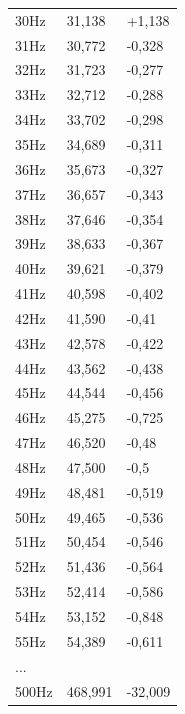 \begin{tabularx}{\textwidth}{lll}
30Hz
 &
31,138
 &
+1,138
\\

31Hz
 &
30,772
 &
-0,328
\\

32Hz
 &
31,723
 &
-0,277
\\

33Hz
 &
32,712
 &
-0,288
\\

34Hz
 &
33,702
 &
-0,298
\\

35Hz
 &
34,689
 &
-0,311
\\

36Hz
 &
35,673
 &
-0,327
\\

37Hz
 &
36,657
 &
-0,343
\\

38Hz
 &
37,646
 &
-0,354
\\

39Hz
 &
38,633
 &
-0,367
\\

40Hz
 &
39,621
 &
-0,379
\\

41Hz
 &
40,598
 &
-0,402
\\

42Hz
 &
41,590
 &
-0,41
\\

43Hz
 &
42,578
 &
-0,422
\\

44Hz
 &
43,562
 &
-0,438
\\

45Hz
 &
44,544
 &
-0,456
\\

46Hz
 &
45,275
 &
-0,725
\\

47Hz
 &
46,520
 &
-0,48
\\

48Hz
 &
47,500
 &
-0,5
\\

49Hz
 &
48,481
 &
-0,519
\\

50Hz
 &
49,465
 &
-0,536
\\

51Hz
 &
50,454
 &
-0,546
\\

52Hz
 &
51,436
 &
-0,564
\\

53Hz
 &
52,414
 &
-0,586
\\

54Hz
 &
53,152
 &
-0,848
\\

55Hz
 &
54,389
 &
-0,611
\\

...
 &  & \\

500Hz
 &
468,991
 &
-32,009
\\
\hline
\end{tabularx}


